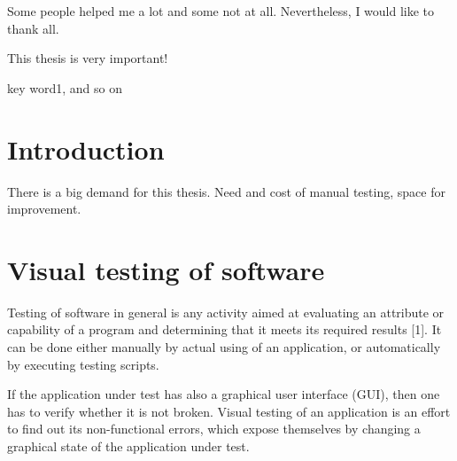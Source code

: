 \documentclass[11pt,oneside,final]{fithesis2}
\begin{document}
\newenvironment{atribut_description}
{\begin{description}
  \renewcommand{\makelabel}[1]{\texttt{\hspace{6pt}##1 $-$}}%
  \setlength{\itemsep}{1pt}
  \setlength{\parskip}{0pt}
  \setlength{\parsep}{0pt}}
{\end{description}}
\renewcommand{\tiny}{\fontsize{7.7}{9.7}\selectfont}

\FrontMatter
\ThesisTitlePage

\begin{ThesisDeclaration}
\DeclarationText
\AdvisorName
\end{ThesisDeclaration}

\begin{ThesisThanks}
Some people helped me a lot and some not at all. Nevertheless, I would like to thank all.
\end{ThesisThanks}

\begin{ThesisAbstract}
This thesis is very important!
\end{ThesisAbstract}
 
\begin{ThesisKeyWords}
key word1, and so on
\end{ThesisKeyWords}
\MainMatter



\renewcommand{\contentsname}{Table of contents}

\tableofcontents

\chapter{Introduction}    
There is a big demand for this thesis.
Need and cost of manual testing, space for improvement.
    
\chapter{Visual testing of software}    
    Testing of software in general is any activity aimed at evaluating an attribute or capability of a program and determining that it meets its required results [1]. 
    It can be done either manually by actual using of an application, or automatically by executing testing scripts.
    
    If the application under test has also a graphical user interface (GUI), then one has to verify whether it is not broken. 
    Visual testing of an application is an effort to find out its non-functional errors, which expose themselves by changing a graphical state of the application under test.
    
\end{document}
